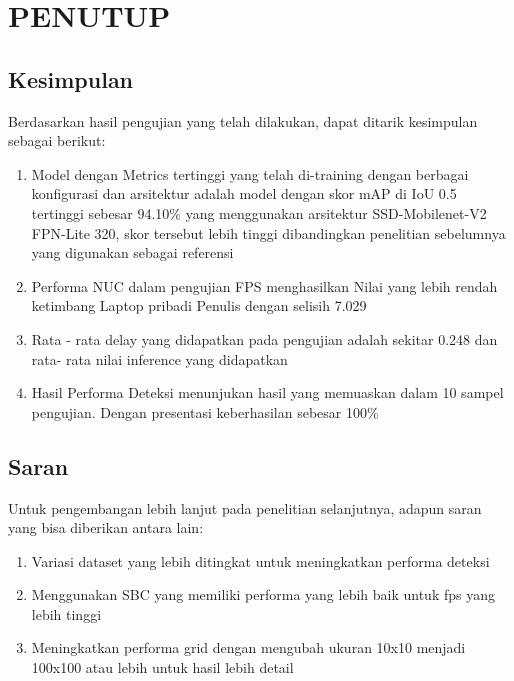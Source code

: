 \chapter{PENUTUP}
\label{chap:penutup}


\section{Kesimpulan}
\label{sec:kesimpulan}

Berdasarkan hasil pengujian yang telah dilakukan, dapat ditarik kesimpulan sebagai berikut:

\begin{enumerate}[nolistsep]
  \item Model dengan Metrics tertinggi yang telah di-training dengan berbagai konfigurasi dan arsitektur adalah model dengan skor mAP di IoU 0.5 tertinggi sebesar 94.10\% yang menggunakan arsitektur SSD-Mobilenet-V2 FPN-Lite 320, skor tersebut lebih tinggi dibandingkan penelitian sebelumnya yang digunakan sebagai referensi
  \item Performa NUC dalam pengujian FPS menghasilkan Nilai yang lebih rendah ketimbang Laptop pribadi Penulis dengan selisih 7.029
  \item Rata - rata delay yang didapatkan pada pengujian adalah sekitar 0.248 dan rata- rata nilai inference yang didapatkan
  \item Hasil Performa Deteksi menunjukan hasil yang memuaskan dalam 10 sampel pengujian. Dengan presentasi keberhasilan sebesar 100\%

\end{enumerate}

\section{Saran}
\label{chap:saran}

Untuk pengembangan lebih lanjut pada penelitian selanjutnya, adapun saran yang bisa diberikan antara lain:

\begin{enumerate}[nolistsep]

  \item Variasi dataset yang lebih ditingkat untuk meningkatkan performa deteksi

  \item Menggunakan SBC yang memiliki performa yang lebih baik untuk fps yang lebih tinggi

  \item Meningkatkan performa grid dengan mengubah ukuran 10x10 menjadi 100x100 atau lebih untuk hasil lebih detail

\end{enumerate}
